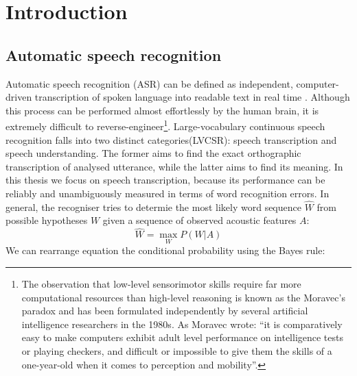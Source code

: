 \chapter{Introduction}
\label{chapter:intro}

\section{Automatic speech recognition}
\label{section:asr}
Automatic speech recognition (ASR)  can be defined as independent, computer-driven transcription of spoken language into readable text in real time \cite{stuckless1994developments} \cite{jelinek1997statistical}. Although this process can be performed almost effortlessly by the human brain, it is extremely difficult to reverse-engineer\footnote{The observation that low-level sensorimotor skills require far more computational resources than high-level reasoning is known as the Moravec's paradox and has been formulated independently by several artificial intelligence researchers in the 1980s. As Moravec wrote: ``it is comparatively easy to make computers exhibit adult level performance on intelligence tests or playing checkers, and difficult or impossible to give them the skills of a one-year-old when it comes to perception and mobility''\cite{moravec1988mind}.}. Large-vocabulary continuous speech recognition falls into two distinct categories(LVCSR): speech transcription and speech understanding. The former aims to find the exact orthographic transcription of analysed utterance, while the latter aims to find its meaning. In this thesis we focus on speech transcription, because its performance can be reliably and unambiguously measured in terms of word recognition errors. In general, the recogniser tries to determie the most likely word sequence $\hat{W}$ from possible hypotheses $W$ given a sequence of observed acoustic features $A$:
\begin{equation}
\label{equation:recogniser}
  \hat{W}=\max_{W}P(W|A)
\end{equation}
We can rearrange equation the conditional probability using the Bayes rule:
